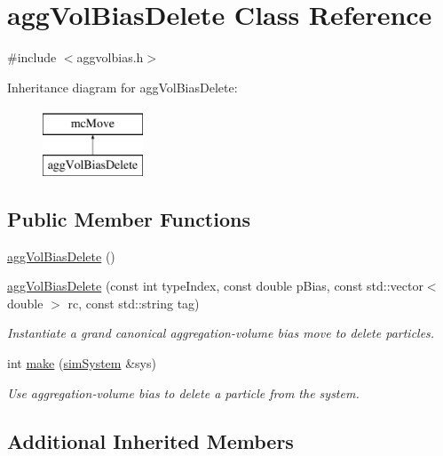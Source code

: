 \hypertarget{classagg_vol_bias_delete}{\section{agg\-Vol\-Bias\-Delete Class Reference}
\label{classagg_vol_bias_delete}
}


{\ttfamily \#include $<$aggvolbias.\-h$>$}

Inheritance diagram for agg\-Vol\-Bias\-Delete\-:\begin{figure}[H]
\begin{center}
\leavevmode
\includegraphics[height=2.000000cm]{classagg_vol_bias_delete}
\end{center}
\end{figure}
\subsection*{Public Member Functions}
\begin{DoxyCompactItemize}
\item 
\hyperlink{classagg_vol_bias_delete_a20979a1dc3c372e9f11daf12330c16cc}{agg\-Vol\-Bias\-Delete} ()
\item 
\hyperlink{classagg_vol_bias_delete_a36412c0e1a86aba8098e0953a64dae3f}{agg\-Vol\-Bias\-Delete} (const int type\-Index, const double p\-Bias, const std\-::vector$<$ double $>$ rc, const std\-::string tag)
\begin{DoxyCompactList}\small\item\em Instantiate a grand canonical aggregation-\/volume bias move to delete particles. \end{DoxyCompactList}\item 
int \hyperlink{classagg_vol_bias_delete_a0692d8bf39ccab1e5e4f0b42c3213e36}{make} (\hyperlink{classsim_system}{sim\-System} \&sys)
\begin{DoxyCompactList}\small\item\em Use aggregation-\/volume bias to delete a particle from the system. \end{DoxyCompactList}\end{DoxyCompactItemize}
\subsection*{Additional Inherited Members}


